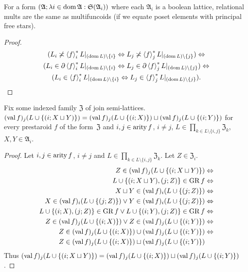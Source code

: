 \begin{prop}
For a form $(\mathfrak{A};\lambda i\in\operatorname{dom}\mathfrak{A}:\mathfrak{S}(\mathfrak{A}_{i}))$
where each $\mathfrak{A}_{i}$ is a boolean lattice, relational mults
are the same as multifuncoids (if we equate poset elements with principal
free stars).\end{prop}
\begin{proof}
~
\begin{multline*}
(L_{i}\not\asymp\left\langle f\right\rangle ^{\ast}_{i}L|_{(\operatorname{dom} L)\setminus\{i\}}\Leftrightarrow L_{j}\not\asymp\left\langle f\right\rangle ^{\ast}_{j}L|_{(\operatorname{dom} L)\setminus\{j\}})\Leftrightarrow\\
(L_{i}\in\partial\left\langle f\right\rangle ^{\ast}_{i}L|_{(\operatorname{dom} L)\setminus\{i\}}\Leftrightarrow L_{j}\in\partial\left\langle f\right\rangle ^{\ast}_{j}L|_{(\operatorname{dom} L)\setminus\{j\}})\Leftrightarrow\\
(L_{i}\in\left\langle f\right\rangle ^{\ast}_{i}L|_{(\operatorname{dom} L)\setminus\{i\}}\Leftrightarrow L_{j}\in\left\langle f\right\rangle ^{\ast}_{j}L|_{(\operatorname{dom} L)\setminus\{j\}}).
\end{multline*}
\end{proof}
\begin{thm}
Fix some indexed family $\mathfrak{Z}$ of join semi-lattices. $(\operatorname{val} f)_{j}(L\cup\{(i;X\sqcup Y)\})=(\operatorname{val} f)_{j}(L\cup\{(i;X)\})\sqcup(\operatorname{val} f)_{j}(L\cup\{(i;Y)\})$
for every prestaroid $f$ of the form~$\mathfrak{Z}$ and $i,j\in\operatorname{arity} f$,
$i\neq j$, $L\in\prod_{k\in L\setminus\{i,j\}}\mathfrak{Z}_{k}$,
$X,Y\in\mathfrak{A}_{i}$.\end{thm}
\begin{proof}
Let $i,j\in\operatorname{arity} f$, $i\ne j$ and $L\in\prod_{k\in L\setminus\{i,j\}}\mathfrak{Z}_{k}$.
Let $Z\in\mathfrak{Z}_{i}$.
\begin{align*}
Z\in(\operatorname{val} f)_{j}(L\cup\{(i;X\sqcup Y)\}) & \Leftrightarrow\\
L\cup\{(i;X\sqcup Y),(j;Z)\}\in\operatorname{GR} f & \Leftrightarrow\\
X\sqcup Y\in(\operatorname{val} f)_{i}(L\cup\{(j;Z)\}) & \Leftrightarrow\\
X\in(\operatorname{val} f)_{i}(L\cup\{(j;Z)\})\lor Y\in(\operatorname{val} f)_{i}(L\cup\{(j;Z)\}) & \Leftrightarrow\\
L\cup\{(i;X),(j;Z)\}\in\operatorname{GR} f\lor L\cup\{(i;Y),(j;Z)\}\in\operatorname{GR} f & \Leftrightarrow\\
Z\in(\operatorname{val} f)_{j}(L\cup\{(i;X)\})\lor Z\in(\operatorname{val} f)_{j}(L\cup\{(i;Y)\}) & \Leftrightarrow\\
Z\in(\operatorname{val} f)_{j}(L\cup\{(i;X)\})\cup(\operatorname{val} f)_{j}(L\cup\{(i;Y)\}) & \Leftrightarrow\\
Z\in(\operatorname{val} f)_{j}(L\cup\{(i;X)\})\sqcup(\operatorname{val} f)_{j}(L\cup\{(i;Y)\})
\end{align*}
Thus $(\operatorname{val} f)_{j}(L\cup\{(i;X\sqcup Y)\})=(\operatorname{val} f)_{j}(L\cup\{(i;X)\})\sqcup(\operatorname{val} f)_{j}(L\cup\{(i;Y)\})$.
\end{proof}
